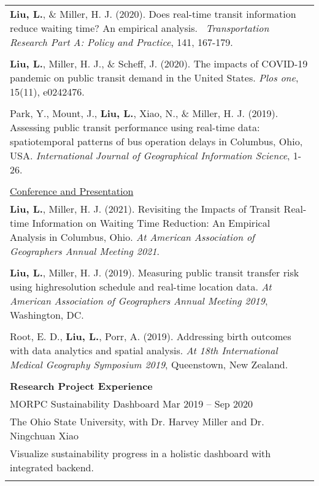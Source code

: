 \documentclass[letterpaper, 11pt]{article}
\begin{document}
\begin{longtable}{p{6.5in}}
\textbf{Liu, L.}, \&  Miller, H. J. (2020). Does real-time transit information reduce waiting time? An empirical analysis.  \textit{Transportation Research Part A: Policy and Practice}, 141, 167-179.\\\\

\textbf{Liu, L.}, Miller, H. J., \& Scheff, J. (2020). The impacts of COVID-19 pandemic on public transit demand in the United States. \textit{Plos one}, 15(11), e0242476.\\\\

Park, Y., Mount, J., \textbf{Liu, L.}, Xiao, N., \& Miller, H. J. (2019). Assessing public transit performance using real-time data: spatiotemporal patterns of bus operation delays in Columbus, Ohio, USA. \textit{International Journal of Geographical Information Science}, 1-26.\\\\

\underline{Conference and Presentation} \\
\textbf{Liu, L.}, Miller, H. J. (2021). Revisiting the Impacts of Transit Real-time Information on Waiting Time Reduction: An Empirical Analysis in Columbus, Ohio. \textit{At American Association of Geographers Annual Meeting 2021}.	\\\\

\textbf{Liu, L.}, Miller, H. J. (2019). Measuring public transit transfer risk using highresolution schedule and real-time location data. \textit{At American Association of Geographers Annual Meeting 2019}, Washington, DC. \\\\

Root, E. D., \textbf{Liu, L.}, Porr, A. (2019). Addressing birth outcomes with data analytics and spatial analysis. \textit{At 18th International Medical Geography Symposium 2019}, Queenstown, New Zealand.	\\\\


\nohyphens{\textbf{Research Project Experience}} \\
MORPC Sustainability Dashboard \hfill Mar 2019 -- Sep 2020 \\
The Ohio State University, with Dr. Harvey Miller and Dr. Ningchuan Xiao \\
Visualize sustainability progress in a holistic dashboard with integrated backend. \\\\


\end{longtable}
\end{document}
